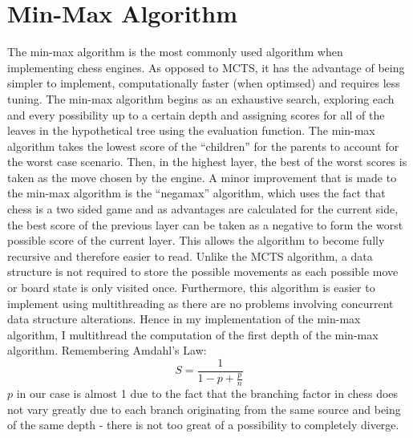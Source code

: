 \chapter{Min-Max Algorithm}
The min-max algorithm is the most commonly used algorithm when implementing chess engines. As opposed to MCTS, it has the advantage of being simpler to implement, computationally faster (when optimsed) and requires less tuning. The min-max algorithm begins as an exhaustive search, exploring each and every possibility up to a certain depth and assigning scores for all of the leaves in the hypothetical tree using the evaluation function. The min-max algorithm takes the lowest score of the ``children'' for the parents to account for the worst case scenario. Then, in the highest layer, the best of the worst scores is taken as the move chosen by the engine. A minor improvement that is made to the min-max algorithm is the ``negamax'' algorithm, which uses the fact that chess is a two sided game and as advantages are calculated for the current side, the best score of the previous layer can be taken as a negative to form the worst possible score of the current layer. This allows the algorithm to become fully recursive and therefore easier to read. Unlike the MCTS algorithm, a data structure is not required to store the possible movements as each possible move or board state is only visited once. Furthermore, this algorithm is easier to implement using multithreading as there are no problems involving concurrent data structure alterations. Hence in my implementation of the min-max algorithm, I multithread the computation of the first depth of the min-max algorithm. Remembering Amdahl's Law: \[S = \frac{1}{1 - p + \frac{p}{n}}\] $p$ in our case is almost 1 due to the fact that the branching factor in chess does not vary greatly due to each branch originating from the same source and being of the same depth - there is not too great of a possibility to completely diverge. 
